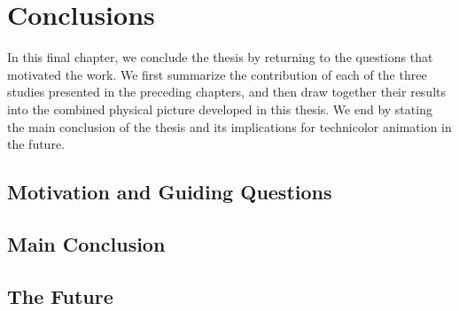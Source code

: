 %
\chapter{Conclusions}
\label{ch:conclusions}
\hypertarget{ch:conclusions}{}
\glsresetall
\quoteSix


In this final chapter, we conclude the thesis by returning to the questions that motivated the work. We first summarize the contribution of each of the three studies presented in the preceding chapters, and then draw together their results into the combined physical picture developed in this thesis. We end by stating the main conclusion of the thesis and its implications for technicolor animation in the future.

\section{Motivation and Guiding Questions}

\section{Main Conclusion}

\section{The Future}



